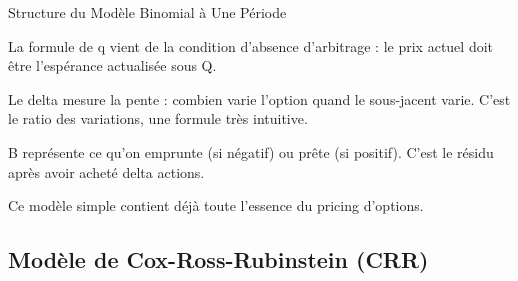 \documentclass[aspectratio=169, 10pt]{beamer}
\begin{document}
\begin{frame}{Structure du Modèle Binomial à Une Période}
{        La formule de q vient de la condition d'absence d'arbitrage :
        le prix actuel doit être l'espérance actualisée sous Q.
        
        Le delta mesure la pente : combien varie l'option quand le sous-jacent varie.
        C'est le ratio des variations, une formule très intuitive.
        
        B représente ce qu'on emprunte (si négatif) ou prête (si positif).
        C'est le résidu après avoir acheté delta actions.
        
        Ce modèle simple contient déjà toute l'essence du pricing d'options.
    }
\end{frame}

\subsection{Modèle de Cox-Ross-Rubinstein (CRR)}
\end{document}
